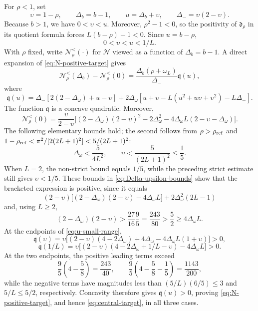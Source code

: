 \documentclass[10pt,twoside]{siamart1116}
\numberwithin{equation}{section}
\begin{document}
For \(\rho<1\), set
\[
 \upsilon=1-\rho,\qquad \Delta_b=b-1,\qquad
 u=\Delta_b+\upsilon,\qquad \Delta_-=\upsilon(2-\upsilon).
\]
Because \(b>1\), we have \(0<\upsilon<u\).  Moreover,
\(\rho^2-1<0\), so the positivity of \(\mathfrak d_\rho\) in its quotient
formula forces \(L(b-\rho)-1<0\).  Since \(u=b-\rho\),
\begin{equation}\label{eq:u-small-range}
 0<\upsilon<u<1/L.
\end{equation}
With \(\rho\) fixed, write \(\mathcal N_\rho^{<}(\mathord\cdot)\) for
\(\mathcal N\) viewed as a function of \(\Delta_b=b-1\).
A direct expansion of \eqref{eq:N-positive-target} gives
\[
 \mathcal N_\rho^{<}(\Delta_b)-\mathcal N_\rho^{<}(0)
 =\frac{\Delta_b(\rho+\omega_L)}{\Delta_-}\mathfrak q(u),
\]
where
\[
 \mathfrak q(u)=\Delta_-[2(2-\Delta_\omega)+u-\upsilon]
 +2\Delta_\omega
 [u+\upsilon-L(u^2+u\upsilon+\upsilon^2)-L\Delta_-].
\]
The function \(\mathfrak q\) is a concave quadratic.  Moreover,
\[
 \mathcal N_\rho^{<}(0)=\frac{\upsilon}{2-\upsilon}
 \bigl[(2-\Delta_\omega)(2-\upsilon)^2
 -2\Delta_\omega^2
 -4\Delta_\omega L(2-\upsilon-\Delta_\omega)\bigr].
\]
The following elementary bounds hold; the second follows from
\(\rho>\rho_{\rm ref}\) and
\(1-\rho_{\rm ref}<\pi^2/[2(2L+1)^2]<5/(2L+1)^2\):
\begin{equation}\label{eq:Delta-upsilon-bounds}
 \Delta_\omega<\frac5{4L^2},\qquad
 \upsilon<\frac5{(2L+1)^2}\leq\frac15.
\end{equation}
When \(L=2\), the non-strict bound equals \(1/5\), while the preceding strict
estimate still gives \(\upsilon<1/5\).  These bounds
in \eqref{eq:Delta-upsilon-bounds} show that the bracketed expression is
positive, since it equals
\[
 (2-\upsilon)
 \bigl[(2-\Delta_\omega)(2-\upsilon)-4\Delta_\omega L\bigr]
 +2\Delta_\omega^2(2L-1)
\]
and, using \(L\geq2\),
\[
 (2-\Delta_\omega)(2-\upsilon)
 >\frac{27}{16}\frac95=\frac{243}{80}
 >\frac52\geq4\Delta_\omega L.
\]
At the endpoints of
\eqref{eq:u-small-range},
\[
 \mathfrak q(\upsilon)=\upsilon
 \bigl[(2-\upsilon)(4-2\Delta_\omega)
 +4\Delta_\omega-4\Delta_\omega L(1+\upsilon)\bigr]>0,
\]
\[
 \mathfrak q(1/L)=\upsilon
 \bigl[(2-\upsilon)(4-2\Delta_\omega+1/L-\upsilon)
 -4\Delta_\omega L\bigr]>0.
\]
At the two endpoints, the positive leading terms exceed
\[
 \frac95\left(4-\frac58\right)=\frac{243}{40},
 \qquad
 \frac95\left(4-\frac58-\frac15\right)=\frac{1143}{200},
\]
while the negative terms have magnitudes less than
\((5/L)(6/5)\leq3\) and \(5/L\leq5/2\), respectively.  Concavity therefore
gives \(\mathfrak q(u)>0\), proving \eqref{eq:N-positive-target}, and hence
\eqref{eq:central-target}, in all three cases.
\end{document}
